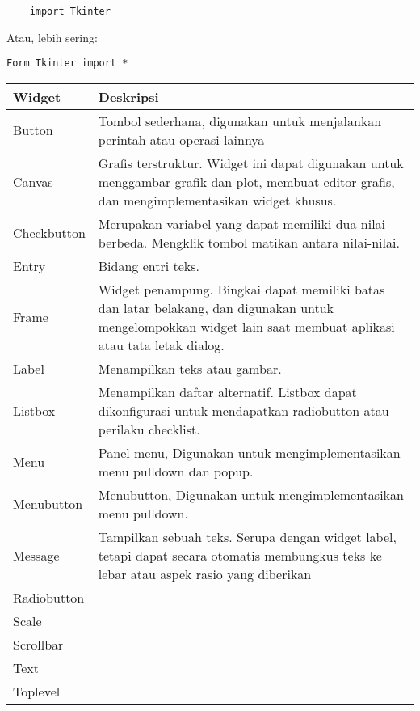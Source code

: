 \begin {verbatim}
	import Tkinter
\end {verbatim}
	
Atau, lebih sering:

\begin {verbatim} 
Form Tkinter import *
\end {verbatim}

\begin {table}
\centering
\begin {tabular}{|l|l|}
	\hline
	Widget & Deskripsi\\
	\hline
	Button & Tombol sederhana, digunakan untuk menjalankan perintah atau operasi lainnya\\
	\hline
	Canvas & Grafis terstruktur. Widget ini dapat digunakan untuk menggambar grafik dan plot, membuat editor grafis, dan mengimplementasikan widget khusus.\\
	\hline
	Checkbutton & Merupakan variabel yang dapat memiliki dua nilai berbeda. Mengklik tombol matikan antara nilai-nilai.\\
	\hline
	Entry & Bidang entri teks.\\
	\hline
	Frame & Widget penampung. Bingkai dapat memiliki batas dan latar belakang, dan digunakan untuk mengelompokkan widget lain saat membuat aplikasi atau tata letak dialog.\\
	\hline
	Label & Menampilkan teks atau gambar.\\
	\hline
	Listbox & Menampilkan daftar alternatif. Listbox dapat dikonfigurasi untuk mendapatkan radiobutton atau perilaku checklist.\\
	\hline
	Menu & Panel menu, Digunakan untuk mengimplementasikan menu pulldown dan popup.\\
	\hline
	Menubutton & Menubutton, Digunakan untuk mengimplementasikan menu pulldown.\\
	\hline
	Message & Tampilkan sebuah teks. Serupa dengan widget label, tetapi dapat secara otomatis membungkus teks ke lebar atau aspek rasio yang diberikan\\
	\hline
	Radiobutton & \\
	\hline
	Scale & \\
	\hline
	Scrollbar & \\
	\hline
	Text & \\
	\hline
	Toplevel & \\
	
\end {tabular}
\end {table}